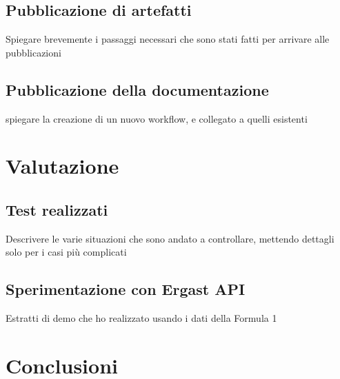 \documentclass[12pt,a4paper,openright,twoside]{book}
\begin{document}
\section{Pubblicazione di artefatti}
Spiegare brevemente i passaggi necessari che sono stati fatti per arrivare
alle pubblicazioni

\section{Pubblicazione della documentazione}
spiegare la creazione di un nuovo workflow, e collegato a quelli esistenti
\chapter{Valutazione}

\section{Test realizzati}
Descrivere le varie situazioni che sono andato a controllare,
mettendo dettagli solo per i casi più complicati

\section{Sperimentazione con Ergast API}
Estratti di demo che ho realizzato usando i dati della Formula 1
\chapter{Conclusioni}





%
%
%

\end{document}
